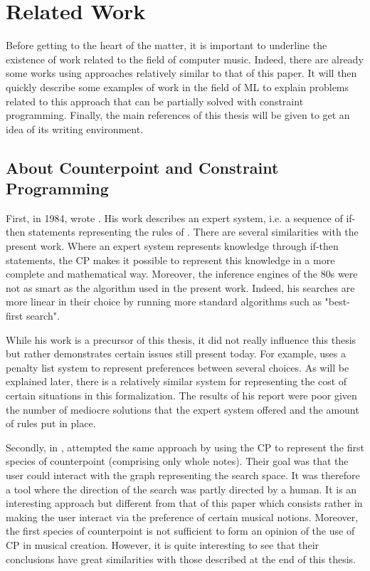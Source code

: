 \chapter*{Related Work}
Before getting to the heart of the matter, it is important to underline the existence of work related to the field of computer music. Indeed, there are already some works using approaches relatively similar to that of this paper. It will then quickly describe some examples of work in the field of ML to explain problems related to this approach that can be partially solved with constraint programming. Finally, the main references of this thesis will be given to get an idea of its writing environment.

\section*{About Counterpoint and Constraint Programming}

First, in 1984, \citeauthor{bill1984} wrote \parencite{bill1984}. His work describes an expert system, i.e. a sequence of if-then statements representing the rules of . There are several similarities with the present work. Where an expert system represents knowledge through if-then statements\parencite{Expertwiki}, the CP makes it possible to represent this knowledge in a more complete and mathematical way. Moreover, the inference engines of the 80s were not as smart as the algorithm used in the present work. Indeed, his searches are more linear in their choice by running more standard algorithms such as "best-first search".

While his work is a precursor of this thesis, it did not really influence this thesis but rather demonstrates certain issues still present today. For example, \citeauthor{bill1984} uses a penalty list system to represent preferences between several choices. As will be explained later, there is a relatively similar system for representing the cost of certain situations in this formalization. The results of his report were poor given the number of mediocre solutions that the expert system offered and the amount of rules put in place.

Secondly, in , \textcite{ovans1992} attempted the same approach by using the CP to represent the first species of counterpoint (comprising only whole notes). Their goal was that the user could interact with the graph representing the search space. It was therefore a tool where the direction of the search was partly directed by a human. It is an interesting approach but different from that of this paper which consists rather in making the user interact via the preference of certain musical notions. Moreover, the first species of counterpoint is not sufficient to form an opinion of the use of CP in musical creation. However, it is quite interesting to see that their conclusions have great similarities with those described at the end of this thesis.

